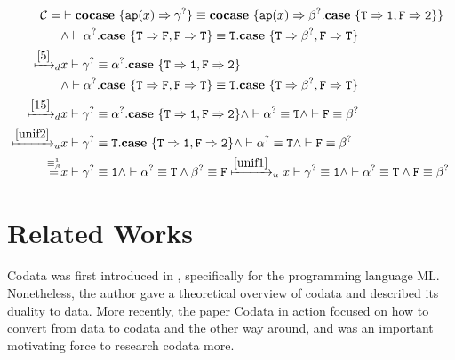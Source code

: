 \documentclass[twoside,12pt,a4paper]{article}
\begin{document}
\begin{example}
    \begin{align*}
        \constraints =& \vdash \excopatmatch{\ap{x}\Rightarrow \gamma^?}\equiv \excopatmatch{\ap{x}\Rightarrow\betaunifvar.\expatmatch{\mathtt{T\Rightarrow 1,F\Rightarrow 2}}}\\
        &\wedge \vdash\alphaunifvar.\expatmatch{\mathtt{T\Rightarrow F, F\Rightarrow T}}\equiv \mathtt{T}.\expatmatch{\mathtt{T\Rightarrow \betaunifvar, F\Rightarrow T}}\\
        \xmapsto{\ref{5}}_d& x\vdash \gamma^?\equiv \alphaunifvar.\expatmatch{\mathtt{T\Rightarrow 1, F\Rightarrow 2}}\\
        &\wedge \vdash\alphaunifvar.\expatmatch{\mathtt{T\Rightarrow F, F\Rightarrow T}}\equiv \mathtt{T}.\expatmatch{\mathtt{T\Rightarrow \betaunifvar, F\Rightarrow T}}\\
        \xmapsto{\ref{15}}_d& x\vdash \gamma^?\equiv \alphaunifvar.\expatmatch{\mathtt{T\Rightarrow 1, F\Rightarrow 2}}\wedge \vdash \alphaunifvar \equiv \mathtt{T}\wedge \vdash \mathtt{F}\equiv \betaunifvar\\%
        \xmapsto{\ref{unif2}}_u& x\vdash \gamma^?\equiv \mathtt{T}.\expatmatch{\mathtt{T\Rightarrow 1, F\Rightarrow 2}}\wedge \vdash \alphaunifvar \equiv \mathtt{T}\wedge \vdash \mathtt{F}\equiv \betaunifvar\\
        \stackrel{\betaconv}{=}& x \vdash \gamma^? \equiv \mathtt{1}\wedge \vdash \alphaunifvar\equiv \mathtt{T} \wedge \betaunifvar\equiv \mathtt{F}\xmapsto{\ref{unif1}}_u x \vdash \gamma^? \equiv \mathtt{1}\wedge \vdash \alphaunifvar\equiv \mathtt{T} \wedge \mathtt{F}\equiv\betaunifvar 
    \end{align*}
\end{example}

\section{Related Works}\label{sec:Related works}

Codata was first introduced in \cite{HAGINO1989629}, specifically for the programming language ML.
Nonetheless, the author gave a theoretical overview of codata and described its duality to data.
More recently, the paper Codata in action \cite{10.1007/978-3-030-17184-1_5} 
focused on how to convert from data to codata and the other way around, 
and was an important motivating force to research codata more.
\end{document}
